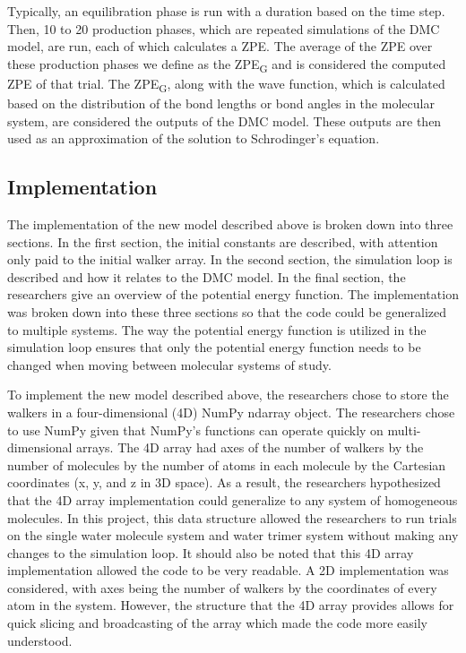 \documentclass[journal=jacsat,manuscript=article]{achemso}
\begin{document}
Typically, an equilibration phase is run with a duration based on the time step. Then, 10 to 20 production phases, which are repeated simulations of the DMC model, are run, each of which calculates a ZPE. The average of the ZPE over these production phases we define as the ZPE\textsubscript{G} and is considered the computed ZPE of that trial. The ZPE\textsubscript{G}, along with the wave function, which is calculated based on the distribution of the bond lengths or bond angles in the molecular system, are considered the outputs of the DMC model. These outputs are then used as an approximation of the solution to Schrodinger’s equation.

\subsection{Implementation}

The implementation of the new model described above is broken down into three sections. In the first section, the initial constants are described, with attention only paid to the initial walker array. In the second section, the simulation loop is described and how it relates to the DMC model. In the final section, the researchers give an overview of the potential energy function. The implementation was broken down into these three sections so that the code could be generalized to multiple systems. The way the potential energy function is utilized in the simulation loop ensures that only the potential energy function needs to be changed when moving between molecular systems of study. 

To implement the new model described above, the researchers chose to store the walkers in a four-dimensional (4D) NumPy ndarray object. The researchers chose to use NumPy given that NumPy’s functions can operate quickly on multi-dimensional arrays. The 4D array had axes of the number of walkers by the number of molecules by the number of atoms in each molecule by the Cartesian coordinates (x, y, and z in 3D space). As a result, the researchers hypothesized that the 4D array implementation could generalize to any system of homogeneous molecules. In this project, this data structure allowed the researchers to run trials on the single water molecule system and water trimer system without making any changes to the simulation loop. It should also be noted that this 4D array implementation allowed the code to be very readable. A 2D implementation was considered, with axes being the number of walkers by the coordinates of every atom in the system. However, the structure that the 4D array provides allows for quick slicing and broadcasting of the array which made the code more easily understood.
\end{document}
